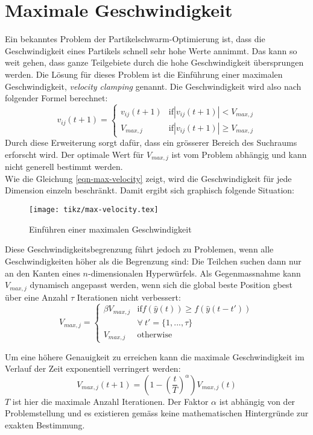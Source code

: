 \section{Maximale Geschwindigkeit}

Ein bekanntes Problem der Partikelschwarm-Optimierung ist, dass die Geschwindigkeit eines Partikels schnell sehr hohe Werte annimmt. Das kann so weit gehen, dass ganze Teilgebiete durch die hohe Geschwindigkeit übersprungen werden. Die Lösung für dieses Problem ist die Einführung einer maximalen Geschwindigkeit, \textit{velocity clamping} genannt. Die Geschwindigkeit wird also nach folgender Formel berechnet:
\begin{equation}
	v_{ij}(t+1) = 
	\begin{cases}
		v_{ij}(t+1) & \text{if} |v_{ij}(t+1)| < V_{max,j} \\
		V_{max,j} & \text{if} |v_{ij}(t+1)| \geq V_{max,j}
	\end{cases}
\end{equation} \label{eqn-max-velocity}
Durch diese Erweiterung sorgt dafür, dass ein grösserer Bereich des Suchraums erforscht wird. Der optimale Wert für $V_{max,j}$ ist vom Problem abhängig und kann nicht generell bestimmt werden. \\

Wie die Gleichung \ref{eqn-max-velocity} zeigt, wird die Geschwindigkeit für jede Dimension einzeln beschränkt. Damit ergibt sich graphisch folgende Situation:

\begin{figure}[htbp]
	\centering
	\texttt{[image: tikz/max-velocity.tex]}
	\caption{Einführen einer maximalen Geschwindigkeit}
	\label{fig-max-velocity}
\end{figure}

Diese Geschwindigkeitsbegrenzung führt jedoch zu Problemen, wenn alle Geschwindigkeiten höher als die Begrenzung sind: Die Teilchen suchen dann nur an den Kanten eines $n$-dimensionalen Hyperwürfels. Als Gegenmassnahme kann $V_{max,j}$ dynamisch angepasst werden, wenn sich die global beste Position gbest über eine Anzahl $\tau$ Iterationen nicht verbessert:
\begin{equation}
	V_{max,j} = 
	\begin{cases}
		\beta V_{max,j} & \text{if} f(\hat{y}(t)) \geq f(\hat{y}(t-t')) \\
			& \forall \: t' = \{ 1, ..., \tau \} \\
		V_{max,j} & \text{otherwise}
	\end{cases}
\end{equation}

Um eine höhere Genauigkeit zu erreichen kann die maximale Geschwindigkeit im Verlauf der Zeit exponentiell verringert werden:
\begin{equation}
	V_{max,j}(t+1) = \left(1-\left(\frac{t}{T}\right)^{\alpha}\right) V_{max,j}(t)
\end{equation}
$T$ ist hier die maximale Anzahl Iterationen. Der Faktor $\alpha$ ist abhängig von der Problemstellung und es existieren gemäss \cite{Han-Modification} keine mathematischen Hintergründe zur exakten Bestimmung. \\